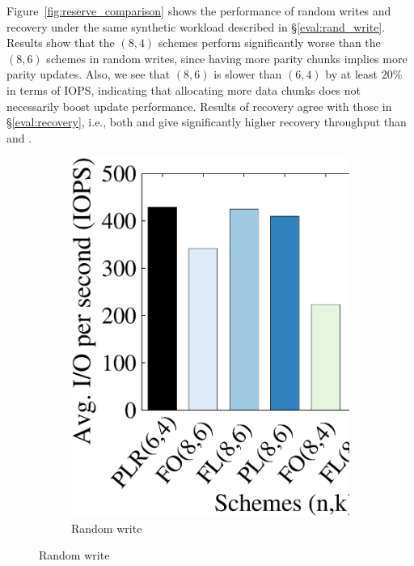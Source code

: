 Figure~\ref{fig:reserve_comparison} shows the performance of random writes 
and recovery under the same synthetic workload described in
\S\ref{eval:rand_write}.  Results show that the $(8,4)$
schemes perform significantly worse than the $(8,6)$ schemes in random writes,
since having more parity chunks implies more parity updates.  Also, we
see that \FO $(8,6)$ is slower than \PLR $(6,4)$ by at least $20\%$ in terms
of IOPS, indicating that allocating more data chunks does not necessarily
boost update performance. Results of recovery agree with those in
\S\ref{eval:recovery}, i.e., both \FO and \PLR give significantly higher
recovery throughput than \FL and \PL. 

\begin{figure}[!t]
\centering
\begin{subfigure}{0.4\linewidth}
    \includegraphics[width=\linewidth]{charts/reserve_overhead/eps/reserve_overhead_randw}
    \caption{Random write}
    \label{subfig:randwrite}
\end{subfigure}

\end{figure}

